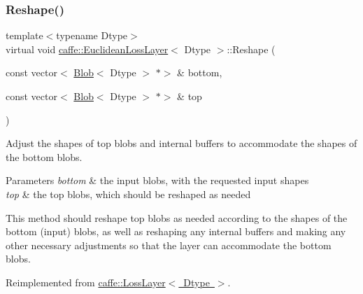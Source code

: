 \subsubsection{\texorpdfstring{Reshape()}{Reshape()}\hspace{0.1cm}{\footnotesize\ttfamily [1/2]}}
{\footnotesize\ttfamily template$<$typename Dtype$>$ \\
virtual void \mbox{\hyperlink{classcaffe_1_1_euclidean_loss_layer}{caffe\+::\+Euclidean\+Loss\+Layer}}$<$ Dtype $>$\+::Reshape (\begin{DoxyParamCaption}\item[{const vector$<$ \mbox{\hyperlink{classcaffe_1_1_blob}{Blob}}$<$ Dtype $>$ $\ast$$>$ \&}]{bottom,  }\item[{const vector$<$ \mbox{\hyperlink{classcaffe_1_1_blob}{Blob}}$<$ Dtype $>$ $\ast$$>$ \&}]{top }\end{DoxyParamCaption})\hspace{0.3cm}{\ttfamily [virtual]}}



Adjust the shapes of top blobs and internal buffers to accommodate the shapes of the bottom blobs. 


\begin{DoxyParams}{Parameters}
{\em bottom} & the input blobs, with the requested input shapes \\
\hline
{\em top} & the top blobs, which should be reshaped as needed\\
\hline
\end{DoxyParams}
This method should reshape top blobs as needed according to the shapes of the bottom (input) blobs, as well as reshaping any internal buffers and making any other necessary adjustments so that the layer can accommodate the bottom blobs. 

Reimplemented from \mbox{\hyperlink{classcaffe_1_1_loss_layer_abf00412194f5413ea9468ee44b0d986f}{caffe\+::\+Loss\+Layer$<$ Dtype $>$}}.

\mbox{\label{classcaffe_1_1_euclidean_loss_layer_a9cbe90ea0130c31bd5b9419a1bbaa555}} 
